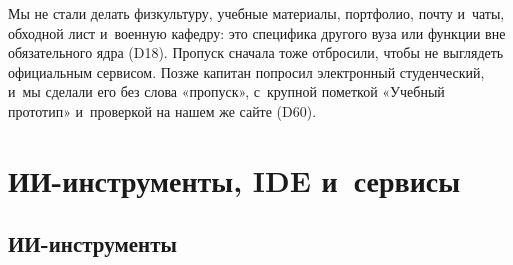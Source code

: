 \documentclass[a4paper,10pt]{article}
\let\oldsubsection\subsection
\renewcommand{\subsection}{\Needspace{10\baselineskip}\oldsubsection}
\begin{document}
Мы не стали делать физкультуру, учебные материалы, портфолио, почту и~чаты, обходной лист и~военную кафедру: это специфика другого вуза или функции вне обязательного ядра (D18). Пропуск сначала тоже отбросили, чтобы не выглядеть официальным сервисом. Позже капитан попросил электронный студенческий, и~мы сделали его без слова «пропуск», с~крупной пометкой «Учебный прототип» и~проверкой на нашем же сайте (D60).

\section{ИИ-инструменты, IDE и~сервисы}\label{s2}

\subsection{ИИ-инструменты}
\end{document}

